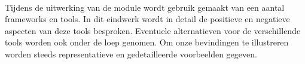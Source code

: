 \paragraph {} Tijdens de uitwerking van de module wordt gebruik gemaakt van een aantal
frameworks en tools. In dit eindwerk wordt in detail de positieve en negatieve aspecten
van deze tools besproken. Eventuele alternatieven voor de verschillende tools worden ook
onder de loep genomen. Om onze bevindingen te illustreren worden steeds representatieve en
gedetailleerde voorbeelden gegeven.
